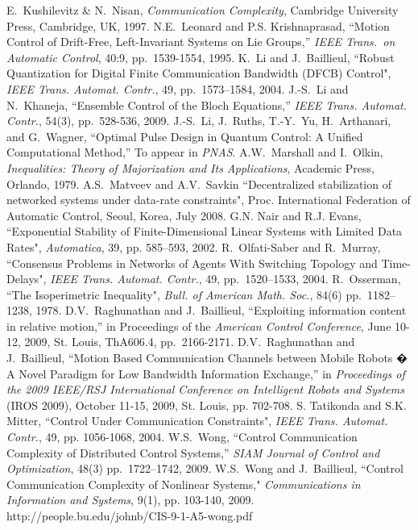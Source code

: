 \documentclass[12pt,onecolumn,draftcls]{IEEEtran}
\begin{document}
\begin{thebibliography}{99}
E.\ Kushilevitz \& N.\ Nisan, {\em Communication Complexity}, Cambridge University Press, Cambridge, UK, 1997.
N.E.\ Leonard and P.S. Krishnaprasad,  ``Motion Control of Drift-Free, Left-Invariant Systems on Lie Groups,''  {\em IEEE Trans.\ on Automatic Control}, 40:9, pp.\ 1539-1554, 1995.
K.\ Li and J.\ Baillieul, ``Robust Quantization for Digital Finite Communication Bandwidth ({DFCB}) Control",
{\em IEEE Trans. Automat. Contr.}, 49, pp.~1573--1584, 2004.
J.-S.\ Li and N.\ Khaneja,  ``Ensemble Control of the Bloch Equations,'' {\em IEEE Trans. Automat. Contr.}, 54(3), pp.\ 528-536, 2009.
J.-S.\ Li, J.\ Ruths, T.-Y.\ Yu, H.\ Arthanari, and G.\ Wagner,  ``Optimal Pulse Design in Quantum Control: A Unified Computational Method,'' To appear in {\em PNAS}.
A.W.\ Marshall and I.\ Olkin, {\em Inequalities: Theory of Majorization and Its Applications}, Academic Press, Orlando, 1979.
A.S.\ Matveev and A.V.\ Savkin ``Decentralized stabilization of
networked systems under data-rate constraints",  Proc.
International Federation of Automatic Control, Seoul, Korea, July 2008.
G.N. Nair and R.J. Evans, ``Exponential Stability of Finite-Dimensional Linear Systems with Limited Data Rates",
{\em Automatica}, 39, pp. 585--593, 2002.
R.\ Olfati-Saber and R.\ Murray, ``Consensus Problems in Networks of Agents With Switching Topology and Time-Delays",
{\em IEEE Trans. Automat. Contr.}, 49, pp.~1520--1533, 2004.
R.\ Osserman, ``The Isoperimetric Inequality", {\em Bull. of American Math. Soc.}, 84(6) pp.~1182--1238, 1978.
D.V.\ Raghunathan and J.\ Baillieul,  ``Exploiting information content in relative motion,''  in Proceedings of the {\em American Control Conference}, June 10-12, 2009, St. Louis, ThA606.4, pp.\ 2166-2171.
D.V.\ Raghunathan and J.\ Baillieul,  ``Motion Based Communication Channels between Mobile Robots � A Novel Paradigm for Low Bandwidth Information Exchange,''  in {\em Proceedings of the  2009 IEEE/RSJ International Conference on Intelligent Robots and Systems} (IROS 2009), October 11-15, 2009, St. Louis, pp. 702-708.
S. Tatikonda and S.K. Mitter, ``Control Under Communication Constraints", {\em IEEE Trans. Automat. Contr.}, 49,
pp. 1056-1068, 2004.
W.S.\ Wong, ``Control Communication Complexity of Distributed Control Systems,'' {\em SIAM Journal of Control and Optimization},
48(3) pp.~1722--1742, 2009.
W.S.\ Wong and J.\ Baillieul, ``Control Communication Complexity of Nonlinear Systems,"  {\em Communications in Information and Systems}, 9(1), pp. 103-140, 2009. http://people.bu.edu/johnb/CIS-9-1-A5-wong.pdf

\end{thebibliography}
\end{document}
